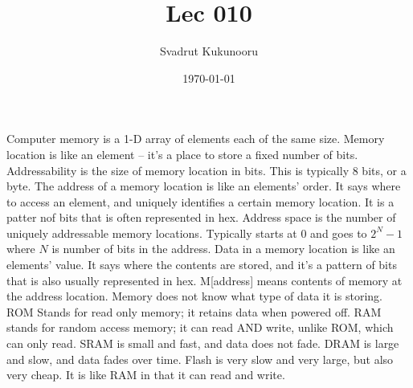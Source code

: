 \documentclass[letterpaper]{report}
\title{Lec 010}
\author{Svadrut Kukunooru}
\date{\today}
\begin{document}
\begin{titlepage}
    \maketitle
\end{titlepage}
    Computer memory is a 1-D array of elements each of the same size. Memory location is like an element -- it's a place to store a fixed number of bits. Addressability is the size of memory location in bits. This is typically 8 bits, or a byte. 
    The address of a memory location is like an elements' order. It says where to access an element, and uniquely identifies a certain memory location. It is a patter nof bits that is often represented in hex. Address space is the number of uniquely addressable memory locations. Typically starts at 0 and goes to $2^N - 1$ where $N$ is number of bits in the address. 
    Data in a memory location is like an elements' value. It says where the contents are stored, and it's a pattern of bits that is also usually represented in hex. M[address] means contents of memory at the address location. Memory does not know what type of data it is storing. 
    ROM Stands for read only memory; it retains data when powered off. RAM stands for random access memory; it can read AND write, unlike ROM, which can only read. SRAM is small and fast, and data does not fade. DRAM is large and slow, and data fades over time. Flash is very slow and very large, but also very cheap. It is like RAM in that it can read and write.
\end{document}
